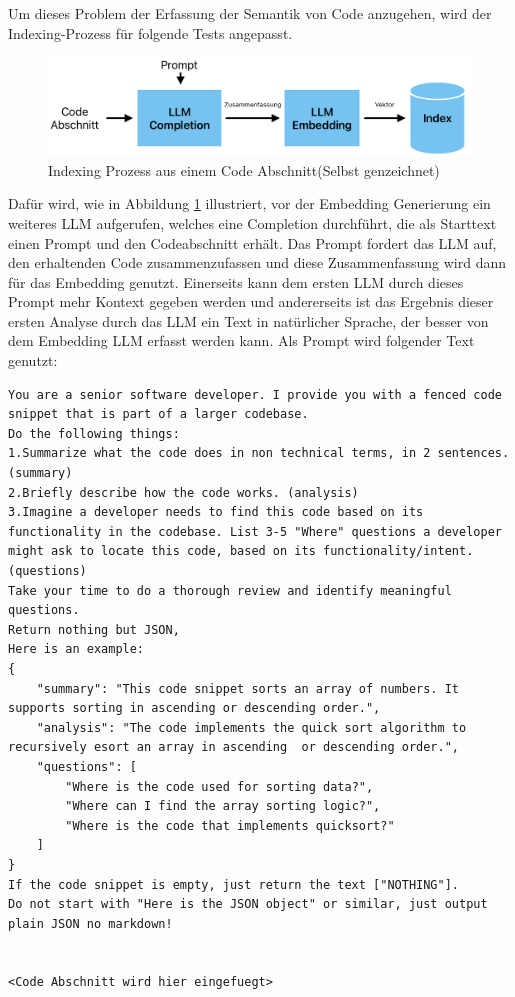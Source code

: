 \documentclass[../main.tex]{subfiles}
\begin{document}
Um dieses Problem der Erfassung der Semantik von Code anzugehen, wird der Indexing-Prozess für folgende Tests angepasst.

\begin{figure}[H]
    \centering
    \includegraphics[scale=.6]{"bilder/prozess.png"}
    \caption{Indexing Prozess aus einem Code Abschnitt(Selbst genzeichnet)}
    \label{fig:indexing}
\end{figure}
Dafür wird, wie in Abbildung \ref{fig:indexing} illustriert, vor der Embedding Generierung ein weiteres \gls{LLM} aufgerufen, welches eine Completion durchführt, die als Starttext einen Prompt und den Codeabschnitt erhält.
Das Prompt fordert das \gls{LLM} auf, den erhaltenden Code zusammenzufassen und diese Zusammenfassung wird dann für das Embedding genutzt.
Einerseits kann dem ersten \gls{LLM} durch dieses Prompt mehr Kontext gegeben werden und andererseits ist das Ergebnis dieser ersten Analyse durch das \gls{LLM} ein Text in natürlicher Sprache, der besser von dem Embedding \gls{LLM} erfasst werden kann.
Als Prompt wird folgender Text genutzt:

\begin{lstlisting}
You are a senior software developer. I provide you with a fenced code snippet that is part of a larger codebase.
Do the following things:
1.Summarize what the code does in non technical terms, in 2 sentences.(summary)
2.Briefly describe how the code works. (analysis)
3.Imagine a developer needs to find this code based on its functionality in the codebase. List 3-5 "Where" questions a developer might ask to locate this code, based on its functionality/intent. (questions)
Take your time to do a thorough review and identify meaningful questions.
Return nothing but JSON,
Here is an example:
{
    "summary": "This code snippet sorts an array of numbers. It supports sorting in ascending or descending order.", 
    "analysis": "The code implements the quick sort algorithm to recursively esort an array in ascending  or descending order.",
    "questions": [
        "Where is the code used for sorting data?",
        "Where can I find the array sorting logic?",
        "Where is the code that implements quicksort?"
    ]
}
If the code snippet is empty, just return the text ["NOTHING"].
Do not start with "Here is the JSON object" or similar, just output plain JSON no markdown!


<Code Abschnitt wird hier eingefuegt>
\end{lstlisting}
\end{document}
